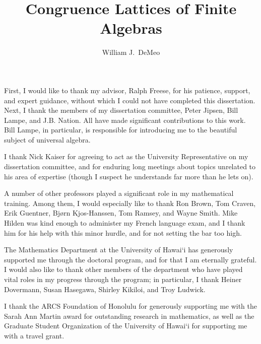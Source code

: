 \documentclass[cm,dissertation,actual,final]{uhthesis}
\theoremstyle{plain}
\theoremstyle{definition}
\theoremstyle{remark}
\numberwithin{theorem}{section}
\numberwithin{claim}{chapter}
\numberwithin{equation}{section}
\numberwithin{conjecture}{chapter}
\newcommand{\<}{\ensuremath{\langle}}
\renewcommand{\>}{\ensuremath{\rangle}}
\newcommand{\0}{\ensuremath{\mathbf{0}}}
\newcommand{\1}{\ensuremath{\mathbf{1}}}
\newcommand{\2}{\ensuremath{\mathbf{2}}}
\newcommand{\3}{\ensuremath{\mathbf{3}}}
\newcommand{\4}{\ensuremath{\mathbf{4}}}
\newcommand{\5}{\ensuremath{\mathbf{5}}}
\begin{document}
    \title{{\bf Congruence Lattices of Finite Algebras}}
    \author{William J.~DeMeo}


\maketitle

\begin{frontmatter}

\copyrightpage


\begin{acknowledgments}
First, I would like to thank my advisor, Ralph Freese, for his patience, support, and expert 
guidance, without which I could not have completed this dissertation.
Next, I thank the members of my dissertation
committee, Peter Jipsen, Bill Lampe, and J.B. Nation.  All have made
significant contributions to this work.
Bill Lampe, in particular, is responsible for introducing me to the
beautiful subject of universal algebra.

I thank Nick Kaiser for agreeing to act as the University Representative on my
dissertation committee, and for enduring long meetings about topics unrelated to his
area of expertise (though I suspect he understands far more than he lets on).

A number of other professors played a significant role in my mathematical
training. Among them, I would especially like to thank Ron Brown, Tom
Craven, Erik Guentner, Bj{\o}rn Kjos-Hanssen, Tom Ramsey, and Wayne Smith.  Mike
Hilden was kind enough 
to administer my French language exam, and I thank him for his help
with this minor hurdle, and for not setting the bar too high.

The Mathematics Department at the University of Hawai`i has generously supported
me through the doctoral program, and for that I am eternally grateful.
I would also like to thank other members of the department who have played vital
roles in my progress through the program; in particular, I thank Heiner
Dovermann, Susan Hasegawa, Shirley Kikiloi, and Troy Ludwick.

I thank the ARCS Foundation of Honolulu for generously supporting me with the
Sarah Ann Martin award for outstanding research in mathematics, 
as well as the Graduate Student Organization of the
University of Hawai`i for supporting me with a travel grant.  


\end{acknowledgments}
\end{frontmatter}
\end{document}
